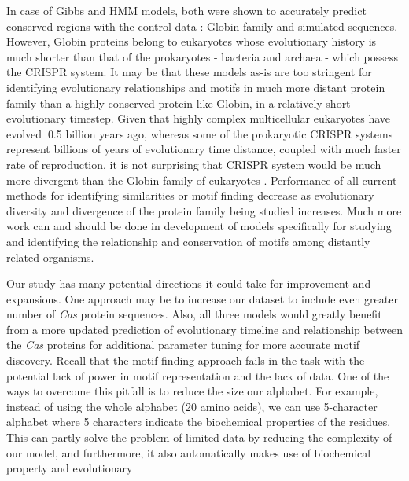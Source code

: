 \documentclass[11pt, oneside]{article}
\begin{document}
In case of Gibbs and HMM models, both were shown to accurately predict conserved regions with the control data : Globin family and simulated sequences. However, Globin proteins belong to eukaryotes whose evolutionary history is much shorter than that of the prokaryotes - bacteria and archaea - which possess the CRISPR system. It may be that these models as-is are too stringent for identifying evolutionary relationships and motifs in much more distant protein family than a highly conserved protein like Globin, in a relatively short evolutionary timestep. Given that highly complex multicellular eukaryotes have evolved $~$0.5 billion years ago, whereas some of the prokaryotic CRISPR systems represent billions of years of evolutionary time distance, coupled with much faster rate of reproduction, it is not surprising that CRISPR system would be much more divergent than the Globin family of eukaryotes \cite{prokHistory}. Performance of all current methods for identifying similarities or motif finding decrease as evolutionary diversity and divergence of the protein family being studied increases. Much more work can and should be done in development of models specifically for studying and identifying the relationship and conservation of motifs among distantly related organisms. 


Our study has many potential directions it could take for improvement and expansions. One approach may be to increase our dataset to include even greater number of \textit{Cas} protein sequences. Also, all three models would greatly benefit from a more updated prediction of evolutionary timeline and relationship between the \textit{Cas} proteins for additional parameter tuning for more accurate motif discovery. Recall that the motif finding approach fails in the task with the potential lack of power in motif representation and the lack of data. One of the ways to overcome this pitfall is to reduce the size our alphabet. For example, instead of using the whole alphabet (20 amino acids), we can use 5-character alphabet where 5 characters indicate the biochemical properties of the residues. This can partly solve the problem of limited data by reducing the complexity of our model, and furthermore, it also automatically makes use of biochemical property and evolutionary 
\end{document}
